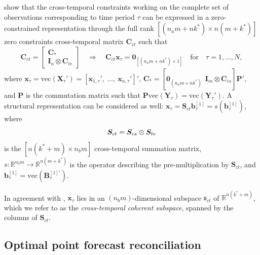 \documentclass[12pt]{article}
\newcommand{\bvet}{\bm{b}}
\newcommand{\xvet}{\bm{x}}
\newcommand{\Bvet}{\bm{B}}
\newcommand{\Cvet}{\bm{C}}
\newcommand{\Ivet}{\bm{I}}
\newcommand{\Pvet}{\bm{P}}
\newcommand{\Svet}{\bm{S}}
\newcommand{\Xvet}{\bm{X}}
\newcommand{\Yvet}{\bm{Y}}
\newcommand{\Zerovet}{\bm{0}}
\theoremstyle{definition}
\begin{document}
\cite{difonzo2023} show that the cross-temporal constraints working on the complete set of observations corresponding to time period $\tau$ can be expressed in a zero-constrained representation through the full rank $\left[(n_am+nk^\ast)\times n(m+k^\ast)\right]$ zero constraints cross-temporal matrix $\Cvet_{ct}$ such that
\begin{equation}
	\label{eq:Cct}
	\Cvet_{ct} = \begin{bmatrix}
		\Cvet_\ast \\[-0.25cm]
		\Ivet_n \otimes \Cvet_{te}
	\end{bmatrix} \quad \Longrightarrow \quad
	\Cvet_{ct} \xvet_{\tau} = \Zerovet_{[(n_am+nk^\ast)\times1]} \quad \mathrm{for} \quad \tau = 1,\dots,N,
\end{equation}
where $\xvet_{\tau} = \mathrm{vec}(\Xvet_{\tau}') = [\xvet_{1, \tau}',~ 	\dots, ~ \xvet_{n, \tau}']'$, $\Cvet_\ast = [\Zerovet_{(n_a m\times nk^\ast)} ~~ \Ivet_m \otimes \Cvet_{cs}]\Pvet'$, and $\Pvet$ is the commutation matrix \citep[][p. 54]{magnus2019} such that $\Pvet \mathrm{vec}(\Yvet_{\tau}) = \mathrm{vec}(\Yvet_{\tau}')$. A structural representation can be considered as well: $\xvet_\tau = \Svet_{ct}\bvet^{[1]}_\tau = s(\bvet_{\tau}^{[1]})$, where \vspace{-0.1cm}
\begin{equation}
	\label{eq:Sct}
	\Svet_{ct} = \Svet_{cs} \otimes \Svet_{te}
	\vspace{-0.1cm}
\end{equation}
is the $\left[n(k^\ast+m)\times n_b m\right]$ cross-temporal summation matrix, $s: \mathbb{R}^{n_b m} \rightarrow \mathbb{R}^{n(m+k^\ast)}$ is the operator describing the pre-multiplication by $\Svet_{ct}$, and $\bvet^{[1]}_\tau = \mathrm{vec}(\Bvet^{[1]\prime}_{\tau})$. 

In agreement with \cite{panagiotelis2021}, $\xvet_{\tau}$ lies in an $(n_b m)$-dimensional subspace $\mathfrak{s}_{ct}$ of $\mathbb{R}^{n(k^\ast+m)}$, which we refer to as the \textit{cross-temporal coherent subspace}, spanned by the columns of $\Svet_{ct}$. %

\subsection{Optimal point forecast reconciliation}\label{ssec:oct}
\end{document}

